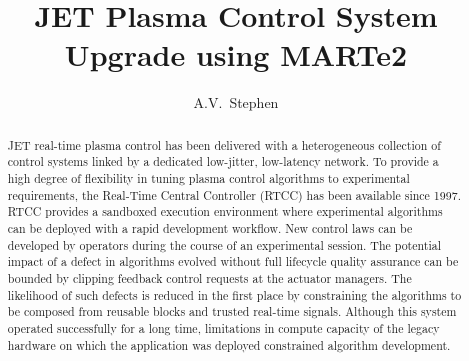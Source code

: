 \documentclass[5p]{elsarticle}
\begin{document}
\begin{frontmatter}



\title{JET Plasma Control System Upgrade using MARTe2}


\author{A.V.~Stephen} %


\begin{abstract}

JET real-time plasma control has been delivered with a heterogeneous collection of control systems linked by a dedicated low-jitter, low-latency network. To provide a high degree of flexibility in tuning plasma control algorithms to experimental requirements, the Real-Time Central Controller (RTCC) has been available since 1997. RTCC provides a sandboxed execution environment where experimental algorithms can be deployed with a rapid development workflow. New control laws can be developed by operators during the course of an experimental session. The potential impact of a defect in algorithms evolved without full lifecycle quality assurance can be bounded by clipping feedback control requests at the actuator managers. The likelihood of such defects is reduced in the first place by constraining the algorithms to be composed from reusable blocks and trusted real-time signals. Although this system operated successfully for a long time, limitations in compute capacity of the legacy hardware on which the application was deployed constrained algorithm development.


\end{abstract}
\end{frontmatter}
\end{document}
